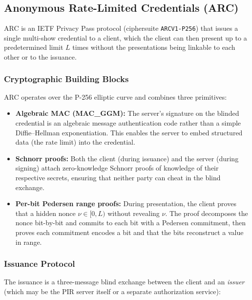 \subsection{Anonymous Rate-Limited Credentials (ARC)}

ARC \cite{arc} is an IETF Privacy Pass protocol (ciphersuite \texttt{ARCV1-P256}) that issues a single multi-show credential to a client, which the client can then present up to a predetermined limit $L$ times without the presentations being linkable to each other or to the issuance.

\subsubsection{Cryptographic Building Blocks}

ARC operates over the P-256 elliptic curve and combines three primitives:

\begin{itemize}[nolistsep,leftmargin=*]
    \item \textbf{Algebraic MAC (MAC\_GGM):} The server's signature on the blinded credential is an algebraic message authentication code rather than a simple Diffie--Hellman exponentiation. This enables the server to embed structured data (the rate limit) into the credential.
    \item \textbf{Schnorr proofs:} Both the client (during issuance) and the server (during signing) attach zero-knowledge Schnorr proofs of knowledge of their respective secrets, ensuring that neither party can cheat in the blind exchange.
    \item \textbf{Per-bit Pedersen range proofs:} During presentation, the client proves that a hidden nonce $\nu \in [0, L)$ without revealing $\nu$. The proof decomposes the nonce bit-by-bit and commits to each bit with a Pedersen commitment, then proves each commitment encodes a bit and that the bits reconstruct a value in range.
\end{itemize}

\subsubsection{Issuance Protocol}

The issuance is a three-message blind exchange between the client and an \emph{issuer} (which may be the PIR server itself or a separate authorization service):

